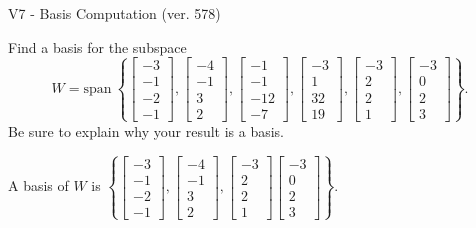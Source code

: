 \begin{exercise}
  \begin{exerciseTitle}V7 - Basis Computation (ver. 578)\end{exerciseTitle}
  \begin{exerciseStatement}
    Find a basis for the subspace 
\[W=\mathrm{span}\ \left\{\left[\begin{array}{r}
-3 \\
-1 \\
-2 \\
-1
\end{array}\right] , \left[\begin{array}{r}
-4 \\
-1 \\
3 \\
2
\end{array}\right] , \left[\begin{array}{r}
-1 \\
-1 \\
-12 \\
-7
\end{array}\right] , \left[\begin{array}{r}
-3 \\
1 \\
32 \\
19
\end{array}\right] , \left[\begin{array}{r}
-3 \\
2 \\
2 \\
1
\end{array}\right] , \left[\begin{array}{r}
-3 \\
0 \\
2 \\
3
\end{array}\right]\right\}.\]
 Be sure to explain why your result is a basis.


  \end{exerciseStatement}
  \begin{exerciseAnswer}
   A basis of \(W\) is  \(\left\{\left[\begin{array}{r}
-3 \\
-1 \\
-2 \\
-1
\end{array}\right] , \left[\begin{array}{r}
-4 \\
-1 \\
3 \\
2
\end{array}\right] , \left[\begin{array}{r}
-3 \\
2 \\
2 \\
1
\end{array}\right] \left[\begin{array}{r}
-3 \\
0 \\
2 \\
3
\end{array}\right]\right\}\).
  


  \end{exerciseAnswer}
\end{exercise}